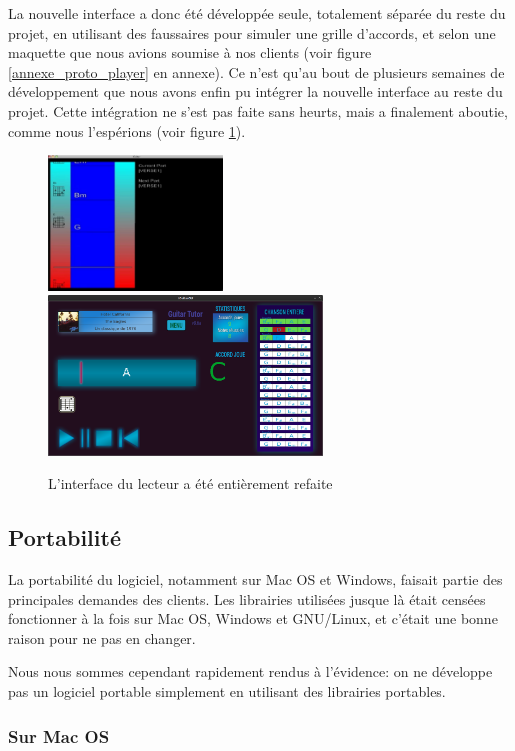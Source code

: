 \documentclass[a4paper,11pt]{article}
\begin{document}
La nouvelle interface a donc été développée seule, totalement séparée du reste du projet, en utilisant des faussaires pour simuler une grille d'accords, et selon une maquette que nous avions soumise à nos clients (voir figure \ref{annexe_proto_player} en annexe). Ce n'est qu'au bout de plusieurs semaines de développement que nous avons enfin pu intégrer la nouvelle interface au reste du projet. Cette intégration ne s'est pas faite sans heurts, mais a finalement aboutie, comme nous l'espérions (voir figure \ref{interface_player}).

\begin{figure}[H]
\begin{center}
\includegraphics[width=175px]{ancien_player.png}
\includegraphics[width=275px]{interface_player.png}
\caption{L'interface du lecteur a été entièrement refaite}
\label{interface_player}
\end{center}
\end{figure}

\subsection{Portabilité}

La portabilité du logiciel, notamment sur Mac OS et Windows, faisait partie des principales demandes des clients. Les librairies utilisées jusque là était censées fonctionner à la fois sur Mac OS, Windows et GNU/Linux, et c'était une bonne raison pour ne pas en changer.

Nous nous sommes cependant rapidement rendus à l'évidence: on ne développe pas un logiciel portable simplement en utilisant des librairies portables.

\subsubsection*{Sur Mac OS}
\end{document}
